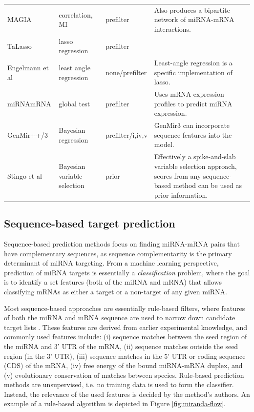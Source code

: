 \begin{table}
{\begin{tabular}{ lp{3cm}lp{5cm} }
    MAGIA \citep{Sales2010}               & correlation, MI               & prefilter & Also produces a bipartite network of miRNA-mRNA interactions. \\
    TaLasso \citep{Muniategui2012}        & lasso \mbox{regression}       & prefilter &  \\
    Engelmann et al \citep{Engelmann2012} & least angle \mbox{regression} & none/prefilter & Least-angle regression is a specific implementation of lasso. \\
    miRNAmRNA \citep{vanIterson2013}      & global test                   & prefilter   & Uses mRNA expression profiles to predict miRNA expression. \\
    GenMir++/3 \citep{Huang2007,Huang2008}& Bayesian \mbox{regression}    & prefilter/i,iv,v & GenMir3 can incorporate sequence features into the model. \\
    Stingo et al \citep{Stingo2010}       & Bayesian \mbox{variable} \mbox{selection} & prior & Effectively a spike-and-slab variable selection approach, scores from any sequence-based method can be used as prior information. \\
    \hline
    \end{tabular}
    }
\end{table}




\subsection{Sequence-based target prediction}

Sequence-based prediction methods focus on finding miRNA-mRNA pairs that
have complementary sequences, as sequence complementarity
is the primary determinant of miRNA targeting.
From a machine learning perspective,
prediction of miRNA targets is essentially a \emph{classification}
problem, where the goal is to identify a set features (both of the miRNA and
mRNA) that allows classifying mRNAs as either a target or a non-target of any
given miRNA.

Most sequence-based approaches are essentially rule-based filters, where
features of both the miRNA and mRNA sequence are used to narrow down candidate
target lists \citep{Yeu2009}. These features are derived from earlier
experimental knowledge, and commonly used features include:
(i) sequence matches between the seed region of the miRNA and 3' UTR of the mRNA,
(ii) sequence matches outside the seed region (in the 3' UTR),
(iii) sequence matches in the 5' UTR or coding sequence (CDS) of the mRNA,
(iv) free energy of the bound miRNA-mRNA duplex, and
(v) evolutionary conservation of matches between species.
Rule-based prediction methods are unsupervised, i.e. no training data is
used to form the classifier. Instead, the relevance of the used features is
decided by the method's authors. An example of a rule-based algorithm
is depicted in Figure \ref{fig:miranda-flow}.

